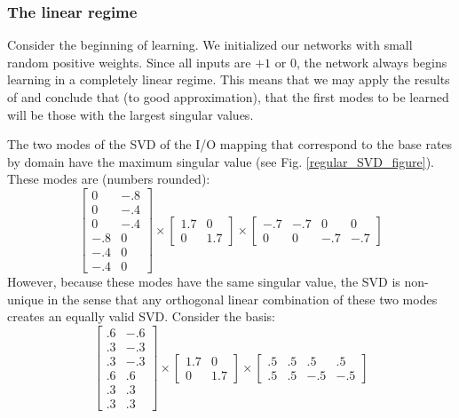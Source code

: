 \documentclass[11pt]{article}
\begin{document}
\subsubsection{The linear regime}
Consider the beginning of learning. We initialized our networks with small random positive weights. Since all inputs are \(+1\) or \(0\), the network always begins learning in a completely linear regime. This means that we may apply the results of \citet{Saxe2013} and conclude that (to good approximation), that the first modes to be learned will be those with the largest singular values. \par 
The two modes of the SVD of the I/O mapping that correspond to the base rates by domain have the maximum singular value (see Fig. \ref{regular_SVD_figure}). These modes are (numbers rounded):
\[
\left[ \begin{array}{cc} 
0   & -.8 \\
0   & -.4 \\
0   & -.4 \\
-.8 & 0 \\
-.4 & 0 \\
-.4 & 0 
\end{array} \right]
\times
\left[ \begin{array}{cc} 
1.7 & 0 \\
0 & 1.7 
\end{array} \right]
\times
\left[ \begin{array}{cccc} 
-.7 & -.7 & 0 & 0 \\ 
0 & 0 & -.7 & -.7 
\end{array} \right]
\]
However, because these modes have the same singular value, the SVD is non-unique in the sense that any orthogonal linear combination of these two modes creates an equally valid SVD. Consider the basis: 
\[
\left[ \begin{array}{cc} 
.6   & -.6 \\
.3  & -.3 \\
.3  & -.3 \\
.6 & .6 \\
.3 & .3 \\
.3 & .3 
\end{array} \right]
\times
\left[ \begin{array}{cc} 
1.7 & 0 \\
0 & 1.7 
\end{array} \right]
\times
\left[ \begin{array}{cccc} 
.5 & .5 & .5 & .5 \\
.5 & .5 & -.5 & -.5 
\end{array} \right]
\]
\end{document}
